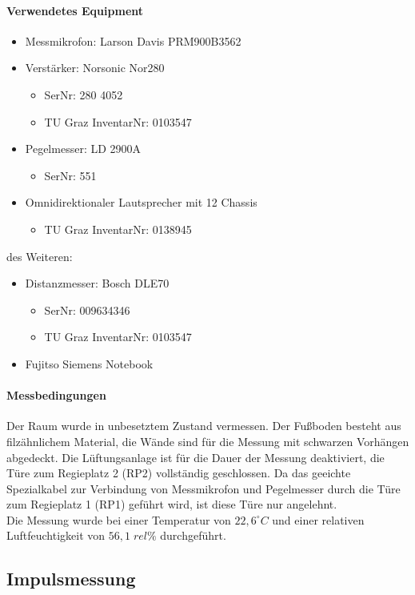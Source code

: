 \documentclass[11pt]{report}
\begin{document}
\paragraph{Verwendetes Equipment}
\begin{itemize}
\item Messmikrofon: Larson Davis PRM900B3562
\item Verstärker: Norsonic Nor280
\begin{itemize}
\item SerNr: 280 4052
\item TU Graz InventarNr: 0103547
\end{itemize}
\item Pegelmesser: LD 2900A
\begin{itemize}
\item SerNr: 551
\end{itemize}
\item Omnidirektionaler Lautsprecher mit 12 Chassis
\begin{itemize}
\item TU Graz InventarNr: 0138945
\end{itemize}
\end{itemize}
des Weiteren:
\begin{itemize}
\item Distanzmesser: Bosch DLE70
\begin{itemize}
\item SerNr: 009634346
\item TU Graz InventarNr: 0103547
\end{itemize}
\item Fujitso Siemens Notebook
\end{itemize}

\paragraph{Messbedingungen}
Der Raum wurde in unbesetztem Zustand vermessen. Der Fußboden besteht aus filzähnlichem Material, die Wände sind für die Messung mit schwarzen Vorhängen abgedeckt. Die Lüftungsanlage ist für die Dauer der Messung deaktiviert, die Türe zum Regieplatz 2 (RP2) vollständig geschlossen. Da das geeichte Spezialkabel zur Verbindung von Messmikrofon und Pegelmesser durch die Türe zum Regieplatz 1 (RP1) geführt wird, ist diese Türe nur angelehnt.\\
Die Messung wurde bei einer Temperatur von $22,6^\circ C $ und einer relativen Luftfeuchtigkeit von $56,1\;rel\%$ durchgeführt.
\subsection{Impulsmessung}
\end{document}
